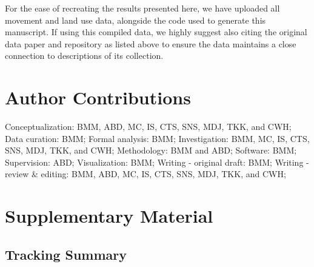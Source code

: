 \documentclass[10pt,a4paper]{article}
\begin{document}
For the ease of recreating the results presented here, we have uploaded all movement and land use data, alongside the code used to generate this manuscript.
If using this compiled data, we highly suggest also citing the original data paper and repository as listed above to ensure the data maintains a close connection to descriptions of its collection.

\section{Author Contributions}\label{author-contributions}

Conceptualization: BMM, ABD, MC, IS, CTS, SNS, MDJ, TKK, and CWH;
Data curation: BMM;
Formal analysis: BMM;
Investigation: BMM, MC, IS, CTS, SNS, MDJ, TKK, and CWH;
Methodology: BMM and ABD;
Software: BMM;
Supervision: ABD;
Visualization: BMM;
Writing - original draft: BMM;
Writing - review \& editing: BMM, ABD, MC, IS, CTS, SNS, MDJ, TKK, and CWH;

\section{Supplementary Material}\label{supplementary-material}

\subsection{Tracking Summary}\label{tracking-summary-1}
\end{document}
